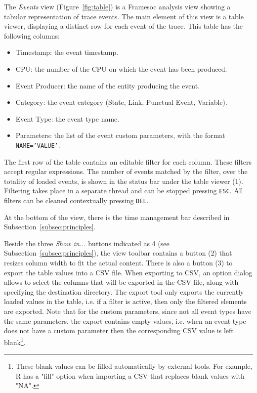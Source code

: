 \documentclass[twoside]{article}
\begin{document}
\begin{sloppypar}
The \emph{Events} view (Figure~\ref{fig:table}) is a Framesoc analysis view showing a tabular representation of trace events.
The main element of this view is a table viewer, displaying a distinct row for each event of the trace.
This table has the following columns:
\begin{itemize}
 \item Timestamp: the event timestamp.
 \item CPU: the number of the CPU on which the event has been produced.
 \item Event Producer: the name of the entity producing the event.
 \item Category: the event category (State, Link, Punctual Event, Variable).
 \item Event Type: the event type name.
 \item Parameters: the list of the event custom parameters, with the format \texttt{NAME='VALUE'}.
\end{itemize}
The first row of the table contains an editable filter for each column. 
These filters accept regular expressions.
The number of events matched by the filter, over the totality of loaded events, is shown in the status bar under the table viewer (\num{1}).
Filtering takes place in a separate thread and can be stopped pressing \texttt{ESC}. 
All filters can be cleaned contextually pressing \texttt{DEL}.

At the bottom of the view, there is the time management bar described in Subsection~\ref{subsec:principles}.

Beside the three \emph{Show in...} buttons indicated as \num{4} (see Subsection~\ref{subsec:principles}), the view toolbar contains a button (\num{2}) that resizes column width to fit the actual content. There is also a button (\num{3}) to export the table values into a CSV file.
When exporting to CSV, an option dialog allows to select the columns that will be exported in the CSV file, along with specifying the destination directory.
The export tool only exports the currently loaded values in the table, i.e. if a filter is active, then only the filtered elements are exported.
Note that for the custom parameters, since not all event types have the same parameters, the export contains empty values, i.e. when an event type does not have a custom parameter then the corresponding CSV value is left blank\footnote{These blank values can be filled automatically by external tools. For example, R has a "fill" option when importing a CSV that replaces blank values with "NA".}.


\end{sloppypar}
\end{document}
